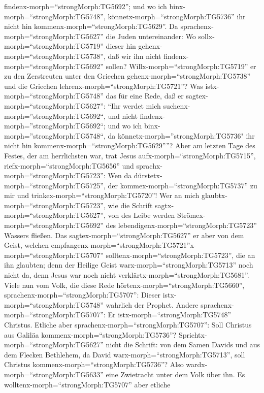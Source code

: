 findenx-morph=``strongMorph:TG5692''; und wo ich
binx-morph=``strongMorph:TG5748'', könnetx-morph=``strongMorph:TG5736''
ihr nicht hin kommenx-morph=``strongMorph:TG5629''.  Da
sprachenx-morph=``strongMorph:TG5627'' die Juden untereinander: Wo
sollx-morph=``strongMorph:TG5719'' dieser hin
gehenx-morph=``strongMorph:TG5738'', daß wir ihn nicht
findenx-morph=``strongMorph:TG5692'' sollen?
Willx-morph=``strongMorph:TG5719'' er zu den Zerstreuten unter den
Griechen gehenx-morph=``strongMorph:TG5738'' und die Griechen
lehrenx-morph=``strongMorph:TG5721''?  Was
istx-morph=``strongMorph:TG5748'' das für eine Rede, daß er
sagtex-morph=``strongMorph:TG5627'': ``Ihr werdet mich
suchenx-morph=''strongMorph:TG5692``, und nicht
findenx-morph=''strongMorph:TG5692``; und wo ich
binx-morph=''strongMorph:TG5748``, da
könnetx-morph=''strongMorph:TG5736" ihr nicht hin
kommenx-morph=``strongMorph:TG5629''''?  Aber am letzten
Tage des Festes, der am herrlichsten war, trat Jesus
aufx-morph=``strongMorph:TG5715'', riefx-morph=``strongMorph:TG5656''
und sprachx-morph=``strongMorph:TG5723'': Wen da
dürstetx-morph=``strongMorph:TG5725'', der
kommex-morph=``strongMorph:TG5737'' zu mir und
trinkex-morph=``strongMorph:TG5720''!  Wer an mich
glaubtx-morph=``strongMorph:TG5723'', wie die Schrift
sagtx-morph=``strongMorph:TG5627'', von des Leibe werden
Strömex-morph=``strongMorph:TG5692'' des
lebendigenx-morph=``strongMorph:TG5723'' Wassers fließen. 
Das sagtex-morph=``strongMorph:TG5627'' er aber von dem Geist, welchen
empfangenx-morph=``strongMorph:TG5721''x-morph=``strongMorph:TG5707''
solltenx-morph=``strongMorph:TG5723'', die an ihn glaubten; denn der
Heilige Geist warx-morph=``strongMorph:TG5713'' noch nicht da, denn
Jesus war noch nicht verklärtx-morph=``strongMorph:TG5681''.
 Viele nun vom Volk, die diese Rede
hörtenx-morph=``strongMorph:TG5660'',
sprachenx-morph=``strongMorph:TG5707'': Dieser
istx-morph=``strongMorph:TG5748'' wahrlich der Prophet. 
Andere sprachenx-morph=``strongMorph:TG5707'': Er
istx-morph=``strongMorph:TG5748'' Christus. Etliche aber
sprachenx-morph=``strongMorph:TG5707'': Soll Christus aus Galiläa
kommenx-morph=``strongMorph:TG5736''? 
Sprichtx-morph=``strongMorph:TG5627'' nicht die Schrift: von dem Samen
Davids und aus dem Flecken Bethlehem, da David
warx-morph=``strongMorph:TG5713'', soll Christus
kommenx-morph=``strongMorph:TG5736''?  Also
wardx-morph=``strongMorph:TG5633'' eine Zwietracht unter dem Volk über
ihn.  Es wolltenx-morph=``strongMorph:TG5707'' aber etliche

